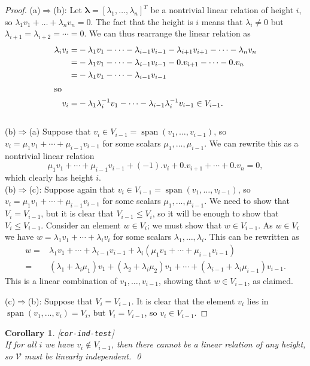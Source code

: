 \documentclass{amsart}
\newcommand{\lbl}[1]{\label{#1}\textup{[\texttt{#1}]}\ \\}
\newcommand{\lbl}{\label}
\newcommand{\spn}       {\operatorname{span}}
\newcommand{\lm}        {\lambda}
\newcommand{\vlm}       {\mathbf{\lambda}}
\newcommand{\CV}        {{\mathcal{V}}}
\renewcommand{\:}       {\colon}
\newtheorem{corollary}[theorem]{Corollary}
\theoremstyle{definition}
\begin{document}
\begin{proof}
 (a)$\Rightarrow$(b):
  Let $\vlm=[\lm_1,\dotsc,\lm_n]^T$ be a nontrivial linear
  relation of height $i$, so $\lm_1v_1+\dotsc+\lm_nv_n=0$.
  The fact that the height is $i$ means that $\lm_i\neq 0$
  but $\lm_{i+1}=\lm_{i+2}=\dotsb=0$.  We can thus rearrange
  the linear relation as
  \begin{align*}
   \lm_iv_i =& -\lm_1v_1 - \dotsb -\lm_{i-1}v_{i-1} 
               -\lm_{i+1}v_{i+1} - \dotsb - \lm_nv_n \\
            =& -\lm_1v_1 - \dotsb -\lm_{i-1}v_{i-1} 
               -0.v_{i+1} - \dotsb - 0.v_n \\
            =& -\lm_1v_1 - \dotsb -\lm_{i-1}v_{i-1} \\
\intertext{so}
   v_i =& -\lm_1\lm_i^{-1}v_1 - \dotsb
          - \lm_{i-1}\lm_i^{-1}v_{i-1} \in V_{i-1}.
  \end{align*}\\[2ex]

 (b)$\Rightarrow$(a)
  Suppose that $v_i\in V_{i-1}=\spn(v_1,\dotsc,v_{i-1})$, so
  $v_i=\mu_1v_1+\dotsb+\mu_{i-1}v_{i-1}$ for some scalars 
  $\mu_1,\dotsc,\mu_{i-1}$.  We can rewrite this as a
  nontrivial linear relation
  \[ \mu_1v_1 + \dotsb + \mu_{i-1}v_{i-1} + (-1).v_i + 
     0.v_{i+1} + \dotsb + 0.v_n = 0,
  \]
  which clearly has height $i$.\\[2ex]

 (b)$\Rightarrow$(c):
  Suppose again that
  $v_i\in V_{i-1}=\spn(v_1,\dotsc,v_{i-1})$, so 
  $v_i=\mu_1v_1+\dotsb+\mu_{i-1}v_{i-1}$ for some scalars 
  $\mu_1,\dotsc,\mu_{i-1}$.  We need to show that
  $V_i=V_{i-1}$, but it is clear that $V_{i-1}\leq V_i$, so
  it will be enough to show that $V_i\leq V_{i-1}$.
  Consider an element $w\in V_i$; we must show that
  $w\in V_{i-1}$.  As $w\in V_i$ we have
  $w=\lm_1v_1+\dotsb+\lm_iv_i$ for some scalars
  $\lm_1,\dotsc,\lm_i$.  This can be rewritten as 
  \begin{align*}
   w =& \lm_1v_1 + \dotsb + \lm_{i-1}v_{i-1} + 
        \lm_i (\mu_1v_1+\dotsb+\mu_{i-1}v_{i-1})  \\
     =& (\lm_1+\lm_i\mu_1)v_1 + 
        (\lm_2+\lm_i\mu_2)v_1 + 
        \dotsb + (\lm_{i-1}+\lm_i\mu_{i-1})v_{i-1}.
  \end{align*}
  This is a linear combination of $v_1,\dotsc,v_{i-1}$,
  showing that $w\in V_{i-1}$, as claimed.

 (c)$\Rightarrow$(b):
  Suppose that $V_i=V_{i-1}$.  It is clear that the element
  $v_i$ lies in $\spn(v_1,\dotsc,v_i)=V_i$, but
  $V_i=V_{i-1}$, so $v_i\in V_{i-1}$.
\end{proof}
\begin{corollary}\lbl{cor-ind-test}
 If for all $i$ we have $v_i\not\in V_{i-1}$, then there
 cannot be a linear relation of any height, so $\CV$ must be
 linearly independent. \qed
\end{corollary}
\end{document}
